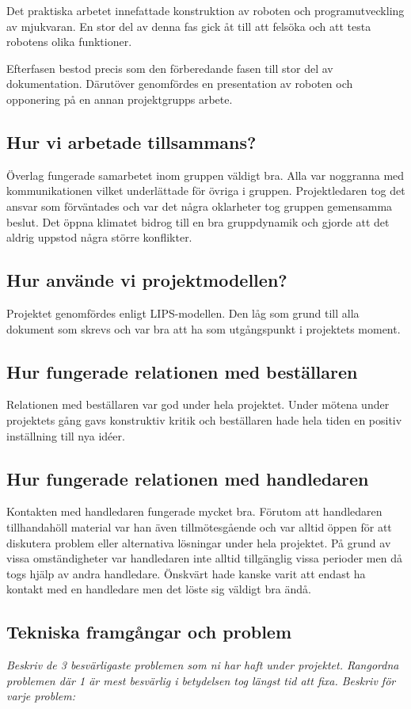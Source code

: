 \documentclass[11pt]{article}
\begin{document}
Det praktiska arbetet innefattade konstruktion av roboten och programutveckling av mjukvaran. En stor del av denna fas gick åt till att felsöka och att testa robotens olika funktioner. 

Efterfasen bestod precis som den förberedande fasen till stor del av dokumentation. Därutöver genomfördes en presentation av roboten och opponering på en annan projektgrupps arbete.

\subsection{Hur vi arbetade tillsammans?}
Överlag fungerade samarbetet inom gruppen väldigt bra. Alla var noggranna med kommunikationen vilket underlättade för övriga i gruppen. Projektledaren tog det ansvar som förväntades och var det några oklarheter tog gruppen gemensamma beslut. Det öppna klimatet bidrog till en bra gruppdynamik och gjorde att det aldrig uppstod några större konflikter.

\subsection{Hur använde vi projektmodellen?} 
Projektet genomfördes enligt LIPS-modellen. Den låg som grund till alla dokument som skrevs och var bra att ha som utgångspunkt i projektets moment. 

\subsection{Hur fungerade relationen med beställaren}
Relationen med beställaren var god under hela projektet. Under mötena under projektets gång gavs konstruktiv kritik och beställaren hade hela tiden en positiv inställning till nya idéer. 

\subsection{Hur fungerade relationen med handledaren}
Kontakten med handledaren fungerade mycket bra. Förutom att handledaren tillhandahöll material var han även  tillmötesgående och var alltid öppen för att diskutera problem eller alternativa lösningar under hela projektet. På grund av vissa omständigheter var handledaren inte alltid tillgänglig vissa perioder men då togs hjälp av andra handledare. Önskvärt hade kanske varit att endast ha kontakt med en handledare men det löste sig väldigt bra ändå.

\subsection{Tekniska framgångar och problem}
\textit{Beskriv de 3 besvärligaste problemen som ni har haft under projektet. Rangordna problemen där 1 är mest besvärlig i betydelsen tog längst tid att fixa. Beskriv för varje problem: }
\end{document}
